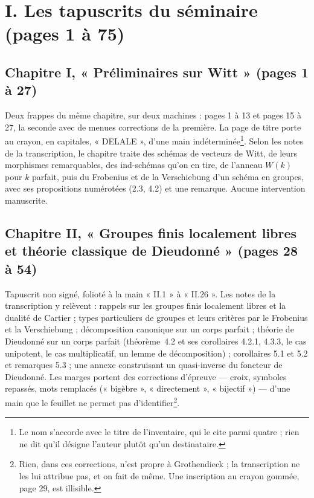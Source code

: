 \documentclass[11pt,a4paper]{article}
\begin{document}
\section*{I. Les tapuscrits du séminaire (pages 1 à 75)}

\subsection*{Chapitre I, « Préliminaires sur Witt » (pages 1 à 27)}

Deux frappes du même chapitre, sur deux machines : pages 1 à 13 et pages
15 à 27, la seconde avec de menues corrections de la première. La page de
titre porte au crayon, en capitales, « DELALE », d'une main
indéterminée\footnote{Le nom s'accorde avec le titre de l'inventaire, qui
le cite parmi quatre ; rien ne dit qu'il désigne l'auteur plutôt qu'un
destinataire.}. Selon les notes de la transcription, le chapitre traite
des schémas de vecteurs de Witt, de leurs morphismes remarquables, des
ind-schémas qu'on en tire, de l'anneau $W(k)$ pour $k$ parfait, puis du
Frobenius et de la Verschiebung d'un schéma en groupes, avec ses
propositions numérotées (2.3, 4.2) et une remarque. Aucune intervention
manuscrite.

\subsection*{Chapitre II, « Groupes finis localement libres et théorie classique de Dieudonné » (pages 28 à 54)}

Tapuscrit non signé, folioté à la main « II.1 » à « II.26 ». Les notes de
la transcription y relèvent : rappels sur les groupes finis localement
libres et la dualité de Cartier ; types particuliers de groupes et leurs
critères par le Frobenius et la Verschiebung ; décomposition canonique sur
un corps parfait ; théorie de Dieudonné sur un corps parfait (théorème~4.2
et ses corollaires 4.2.1, 4.3.3, le cas unipotent, le cas multiplicatif,
un lemme de décomposition) ; corollaires 5.1 et 5.2 et remarques 5.3 ;
une annexe construisant un quasi-inverse du foncteur de Dieudonné. Les
marges portent des corrections d'épreuve — croix, symboles repassés, mots
remplacés (« bigèbre », « directement », « bijectif ») — d'une main que le
feuillet ne permet pas d'identifier\footnote{Rien, dans ces corrections,
n'est propre à Grothendieck ; la transcription ne les lui attribue pas, et
on fait de même. Une inscription au crayon gommée, page 29, est
illisible.}.
\end{document}
